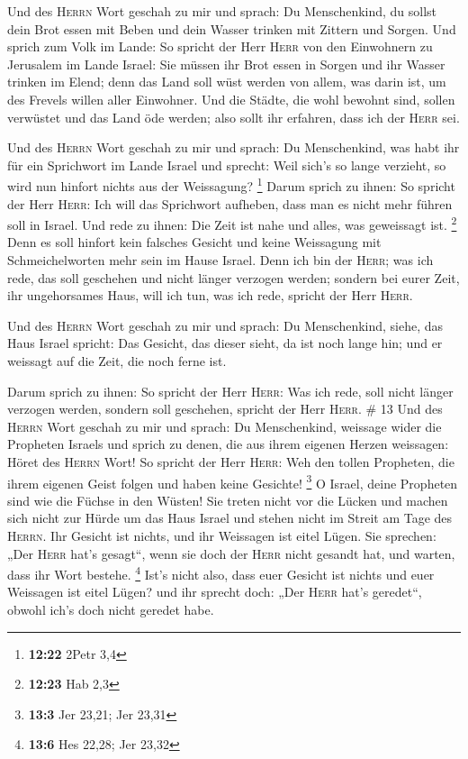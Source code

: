  Und des \textsc{Herrn} Wort geschah zu mir und sprach:
 Du Menschenkind, du sollst dein Brot essen mit Beben und
dein Wasser trinken mit Zittern und Sorgen.  Und sprich
zum Volk im Lande: So spricht der Herr \textsc{Herr} von den Einwohnern
zu Jerusalem im Lande Israel: Sie müssen ihr Brot essen in Sorgen und
ihr Wasser trinken im Elend; denn das Land soll wüst werden von allem,
was darin ist, um des Frevels willen aller Einwohner. 
Und die Städte, die wohl bewohnt sind, sollen verwüstet und das Land öde
werden; also sollt ihr erfahren, dass ich der \textsc{Herr} sei.

 Und des \textsc{Herrn} Wort geschah zu mir und sprach:
 Du Menschenkind, was habt ihr für ein Sprichwort im
Lande Israel und sprecht: Weil sich's so lange verzieht, so wird nun
hinfort nichts aus der Weissagung? \footnote{\textbf{12:22} 2Petr 3,4}
 Darum sprich zu ihnen: So spricht der Herr
\textsc{Herr}: Ich will das Sprichwort aufheben, dass man es nicht mehr
führen soll in Israel. Und rede zu ihnen: Die Zeit ist nahe und alles,
was geweissagt ist. \footnote{\textbf{12:23} Hab 2,3} 
Denn es soll hinfort kein falsches Gesicht und keine Weissagung mit
Schmeichelworten mehr sein im Hause Israel.  Denn ich bin
der \textsc{Herr}; was ich rede, das soll geschehen und nicht länger
verzogen werden; sondern bei eurer Zeit, ihr ungehorsames Haus, will ich
tun, was ich rede, spricht der Herr \textsc{Herr}.

 Und des \textsc{Herrn} Wort geschah zu mir und sprach:
 Du Menschenkind, siehe, das Haus Israel spricht: Das
Gesicht, das dieser sieht, da ist noch lange hin; und er weissagt auf
die Zeit, die noch ferne ist.

 Darum sprich zu ihnen: So spricht der Herr
\textsc{Herr}: Was ich rede, soll nicht länger verzogen werden, sondern
soll geschehen, spricht der Herr \textsc{Herr}. \# 13  Und
des \textsc{Herrn} Wort geschah zu mir und sprach:  Du
Menschenkind, weissage wider die Propheten Israels und sprich zu denen,
die aus ihrem eigenen Herzen weissagen: Höret des \textsc{Herrn} Wort!
 So spricht der Herr \textsc{Herr}: Weh den tollen
Propheten, die ihrem eigenen Geist folgen und haben keine Gesichte!
\footnote{\textbf{13:3} Jer 23,21; Jer 23,31}  O Israel,
deine Propheten sind wie die Füchse in den Wüsten!  Sie
treten nicht vor die Lücken und machen sich nicht zur Hürde um das Haus
Israel und stehen nicht im Streit am Tage des \textsc{Herrn}.
 Ihr Gesicht ist nichts, und ihr Weissagen ist eitel
Lügen. Sie sprechen: „Der \textsc{Herr} hat's gesagt``, wenn sie doch
der \textsc{Herr} nicht gesandt hat, und warten, dass ihr Wort bestehe.
\footnote{\textbf{13:6} Hes 22,28; Jer 23,32}  Ist's nicht
also, dass euer Gesicht ist nichts und euer Weissagen ist eitel Lügen?
und ihr sprecht doch: „Der \textsc{Herr} hat's geredet``, obwohl ich's
doch nicht geredet habe.

